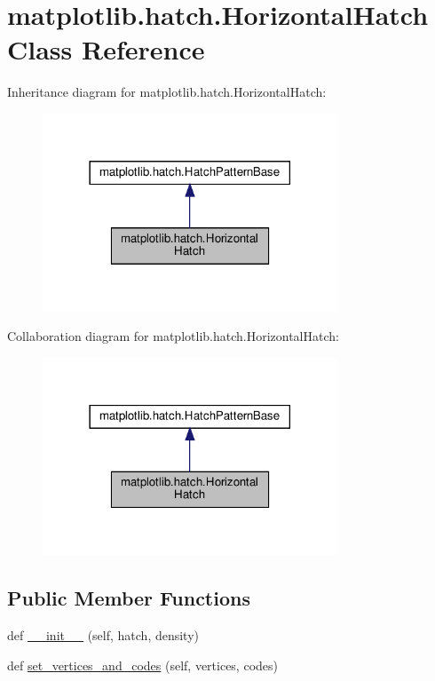 \hypertarget{classmatplotlib_1_1hatch_1_1HorizontalHatch}{}\section{matplotlib.\+hatch.\+Horizontal\+Hatch Class Reference}
\label{classmatplotlib_1_1hatch_1_1HorizontalHatch}


Inheritance diagram for matplotlib.\+hatch.\+Horizontal\+Hatch\+:
\nopagebreak
\begin{figure}[H]
\begin{center}
\leavevmode
\includegraphics[width=249pt]{classmatplotlib_1_1hatch_1_1HorizontalHatch__inherit__graph}
\end{center}
\end{figure}


Collaboration diagram for matplotlib.\+hatch.\+Horizontal\+Hatch\+:
\nopagebreak
\begin{figure}[H]
\begin{center}
\leavevmode
\includegraphics[width=249pt]{classmatplotlib_1_1hatch_1_1HorizontalHatch__coll__graph}
\end{center}
\end{figure}
\subsection*{Public Member Functions}
\begin{DoxyCompactItemize}
\item 
def \hyperlink{classmatplotlib_1_1hatch_1_1HorizontalHatch_a08e78606141ea1b716254c30409d00ba}{\+\_\+\+\_\+init\+\_\+\+\_\+} (self, hatch, density)
\item 
def \hyperlink{classmatplotlib_1_1hatch_1_1HorizontalHatch_a1aec8ec948f9773f0e83ae66942f88dc}{set\+\_\+vertices\+\_\+and\+\_\+codes} (self, vertices, codes)
\end{DoxyCompactItemize}

